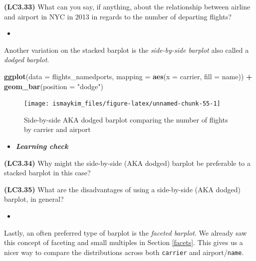 \documentclass[12pt,]{krantz}
\makeatletter
\newenvironment{Shaded}{\begin{snugshade}}{\end{snugshade}}
\newcommand{\KeywordTok}[1]{\textcolor[rgb]{0.27,0.27,0.27}{\textbf{#1}}}
\newcommand{\DataTypeTok}[1]{\textcolor[rgb]{0.27,0.27,0.27}{#1}}
\newcommand{\StringTok}[1]{\textcolor[rgb]{0.5,0.5,0.5}{#1}}
\newcommand{\OperatorTok}[1]{\textcolor[rgb]{0.43,0.43,0.43}{\textbf{#1}}}
\newcommand{\NormalTok}[1]{#1}
\newenvironment{kframe}{%
\medskip{}
\setlength{\fboxsep}{.8em}
 \def\at@end@of@kframe{}%
 \ifinner\ifhmode%
  \def\at@end@of@kframe{\end{minipage}}%
  \begin{minipage}{\columnwidth}%
 \fi\fi%
 \def\FrameCommand##1{\hskip\@totalleftmargin \hskip-\fboxsep
 \colorbox{shadecolor}{##1}\hskip-\fboxsep
     \hskip-\linewidth \hskip-\@totalleftmargin \hskip\columnwidth}%
 \MakeFramed {\advance\hsize-\width
   \@totalleftmargin\z@ \linewidth\hsize
   \@setminipage}}%
 {\par\unskip\endMakeFramed%
 \at@end@of@kframe}
\renewenvironment{Shaded}{\begin{kframe}}{\end{kframe}}
\newenvironment{rmdblock}[1]
  {\begin{shaded*}
  \begin{itemize}
  \renewcommand{\labelitemi}{
    \raisebox{-.7\height}[0pt][0pt]{
    }
  }
  \item
  }
  {
  \end{itemize}
  \end{shaded*}
  }
\newenvironment{learncheck}
  {\begin{rmdblock}{warning}}
  {\end{rmdblock}}
\theoremstyle{definition}
\theoremstyle{definition}
\theoremstyle{definition}
\theoremstyle{remark}
\makeatother
\begin{document}
\textbf{(LC3.33)} What can you say, if anything, about the relationship
between airline and airport in NYC in 2013 in regards to the number of
departing flights?

\begin{learncheck}

\end{learncheck}

Another variation on the stacked barplot is the \emph{side-by-side
barplot} also called a \emph{dodged barplot}.

\begin{Shaded}
\begin{Highlighting}[]
\KeywordTok{ggplot}\NormalTok{(}\DataTypeTok{data =}\NormalTok{ flights_namedports, }
       \DataTypeTok{mapping =} \KeywordTok{aes}\NormalTok{(}\DataTypeTok{x =}\NormalTok{ carrier, }\DataTypeTok{fill =}\NormalTok{ name)) }\OperatorTok{+}
\StringTok{  }\KeywordTok{geom_bar}\NormalTok{(}\DataTypeTok{position =} \StringTok{"dodge"}\NormalTok{)}
\end{Highlighting}
\end{Shaded}

\begin{figure}

{\centering \texttt{[image: ismaykim\_files/figure-latex/unnamed-chunk-55-1]} 

}

\caption{Side-by-side AKA dodged barplot comparing the number of flights by carrier and airport}\label{fig:unnamed-chunk-55}
\end{figure}

\begin{learncheck}
\textbf{\emph{Learning check}}
\end{learncheck}

\textbf{(LC3.34)} Why might the side-by-side (AKA dodged) barplot be
preferable to a stacked barplot in this case?

\textbf{(LC3.35)} What are the disadvantages of using a side-by-side
(AKA dodged) barplot, in general?

\begin{learncheck}

\end{learncheck}

Lastly, an often preferred type of barplot is the \emph{faceted
barplot}. We already saw this concept of faceting and small multiples in
Section \ref{facets}. This gives us a nicer way to compare the
distributions across both \texttt{carrier} and airport/\texttt{name}.
\end{document}
